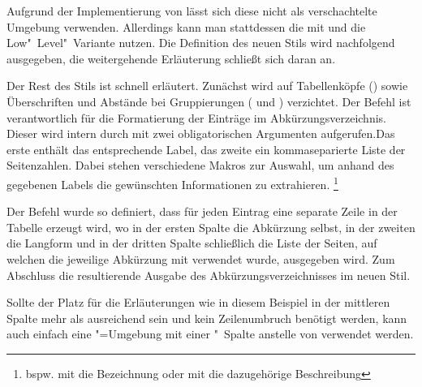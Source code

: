 \documentclass[%
  english,ngerman,%
  geometry=no,DIV=12,automark,%
]{tudscrartcl}
\begin{document}
Aufgrund der Implementierung von  lässt sich diese nicht 
als verschachtelte Umgebung verwenden. Allerdings kann man stattdessen die mit 
 und  die Low"~Level"~Variante nutzen. Die 
Definition des neuen Stils  wird nachfolgend ausgegeben, 
die weitergehende Erläuterung schließt sich daran an.
%
\CodeHook{\let\newglossarystyle\renewglossarystyle}
\begin{Hint*}

\end{Hint*}
%
Der Rest des Stils ist schnell erläutert. Zunächst wird auf Tabellenköpfe 
() sowie Überschriften und Abstände bei Gruppierungen 
( und ) verzichtet. Der Befehl 
 ist verantwortlich für die Formatierung der Einträge 
im Abkürzungsverzeichnis. Dieser wird intern durch  mit 
zwei obligatorischen Argumenten aufgerufen.Das erste enthält das entsprechende 
Label, das zweite ein kommaseparierte Liste der Seitenzahlen. Dabei stehen 
verschiedene Makros zur Auswahl, um anhand des gegebenen Labels die gewünschten 
Informationen zu extrahieren.%
\footnote{%
  bspw. mit  die Bezeichnung oder mit 
   die dazugehörige Beschreibung%
}

Der Befehl  wurde so definiert, dass für jeden Eintrag eine 
separate Zeile in der Tabelle erzeugt wird, wo in der ersten Spalte die 
Abkürzung selbst, in der zweiten die Langform und in der dritten Spalte 
schließlich die Liste der Seiten, auf welchen die jeweilige Abkürzung mit 
 verwendet wurde, ausgegeben wird. Zum Abschluss 
die resultierende Ausgabe des Abkürzungsverzeichnisses im neuen Stil.
%
\begin{Hint}
\printacronyms[style=acrotabularx]
\end{Hint}
\begin{quoting}[rightmargin=0pt]
\vspace*{-\baselineskipglue}
\InputCode
\end{quoting}
%
Sollte der Platz für die Erläuterungen wie in diesem Beispiel in der mittleren 
Spalte mehr als ausreichend sein und kein Zeilenumbruch benötigt werden, kann 
auch einfach eine "=Umgebung mit einer "~Spalte 
anstelle von  verwendet werden.
\end{document}
